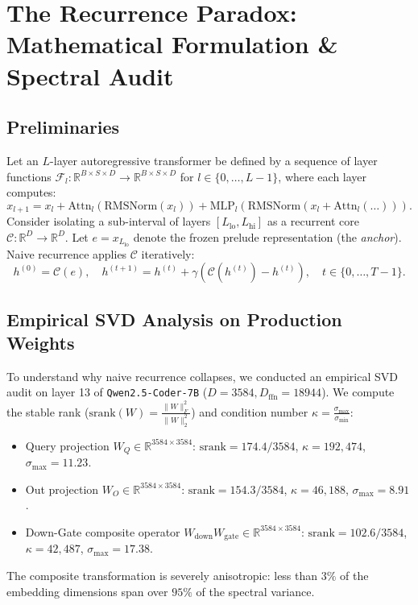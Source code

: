 \documentclass[11pt,a4paper]{article}
\theoremstyle{plain}
\theoremstyle{definition}
\theoremstyle{remark}
\begin{document}
\section{The Recurrence Paradox: Mathematical Formulation \& Spectral Audit}

\subsection{Preliminaries}
Let an $L$-layer autoregressive transformer be defined by a sequence of layer functions $\mathcal{F}_l: \mathbb{R}^{B \times S \times D} \to \mathbb{R}^{B \times S \times D}$ for $l \in \{0, \dots, L-1\}$, where each layer computes:
\begin{equation}
    x_{l+1} = x_l + \text{Attn}_l(\text{RMSNorm}(x_l)) + \text{MLP}_l(\text{RMSNorm}(x_l + \text{Attn}_l(\dots))).
\end{equation}
Consider isolating a sub-interval of layers $[L_{\text{lo}}, L_{\text{hi}}]$ as a recurrent core $\mathcal{C}: \mathbb{R}^D \to \mathbb{R}^D$. Let $e = x_{L_{\text{lo}}}$ denote the frozen prelude representation (the \textit{anchor}). Naive recurrence applies $\mathcal{C}$ iteratively:
\begin{equation}
    h^{(0)} = \mathcal{C}(e), \quad h^{(t+1)} = h^{(t)} + \gamma \left( \mathcal{C}(h^{(t)}) - h^{(t)} \right), \quad t \in \{0, \dots, T-1\}.
\end{equation}

\subsection{Empirical SVD Analysis on Production Weights}
To understand why naive recurrence collapses, we conducted an empirical SVD audit on layer 13 of \texttt{Qwen2.5-Coder-7B} ($D=3584, D_{\text{ffn}}=18944$). We compute the stable rank ($\text{srank}(W) = \frac{\|W\|_F^2}{\|W\|_2^2}$) and condition number $\kappa = \frac{\sigma_{\max}}{\sigma_{\min}}$:
\begin{itemize}
    \item Query projection $W_Q \in \mathbb{R}^{3584 \times 3584}$: $\text{srank} = 174.4 / 3584$, $\kappa = 192{,}474$, $\sigma_{\max} = 11.23$.
    \item Out projection $W_O \in \mathbb{R}^{3584 \times 3584}$: $\text{srank} = 154.3 / 3584$, $\kappa = 46{,}188$, $\sigma_{\max} = 8.91$.
    \item Down-Gate composite operator $W_{\text{down}} W_{\text{gate}} \in \mathbb{R}^{3584 \times 3584}$: $\text{srank} = 102.6 / 3584$, $\kappa = 42{,}487$, $\sigma_{\max} = 17.38$.
\end{itemize}
The composite transformation is severely anisotropic: less than $3\%$ of the embedding dimensions span over $95\%$ of the spectral variance.
\end{document}
